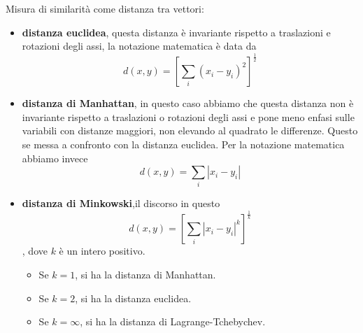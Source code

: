 Misura di similarità come distanza tra vettori: 
\begin{itemize}
    \item \textbf{distanza euclidea}, questa distanza  è invariante rispetto a traslazioni e rotazioni degli assi, la notazione matematica è data da\[\displaystyle d(x,y) = \left[\sum_i (x_i - y_i)^2\right]^{\frac{1}{2}}\]
    \item \textbf{distanza di Manhattan}, in questo caso abbiamo che questa distanza non è invariante rispetto a traslazioni o rotazioni degli assi e pone meno enfasi sulle variabili con distanze maggiori, non elevando al quadrato le differenze. Questo se messa a confronto con la distanza euclidea. Per la notazione matematica abbiamo invece \[d(x,y) = \sum_i |x_i - y_i|\] 
    \item \textbf{distanza di Minkowski},il discorso in questo \[\displaystyle d(x,y) = \left[\sum_i |x_i - y_i|^k\right]^{\frac{1}{k}}\], dove $k$ è un intero positivo.
    \begin{itemize}
        \item Se $k=1$, si ha la distanza di Manhattan.
        \item Se $k=2$, si ha la distanza euclidea.
        \item Se $k=\infty$, si ha la distanza di Lagrange-Tchebychev.
\end{itemize}
\end{itemize}


